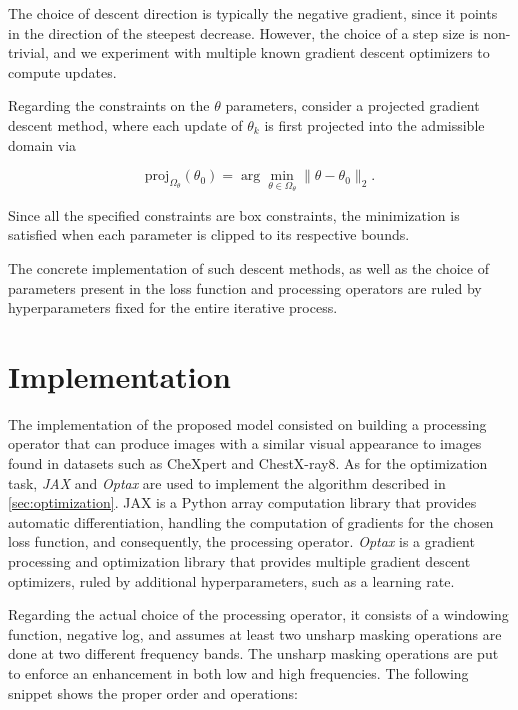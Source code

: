 \documentclass[nomenclature, english, bibtex]{kththesis}
\numberwithin{listing}{chapter}
\begin{document}
The choice of descent direction is typically the negative gradient, since it points in the direction of the steepest
decrease. However, the choice of a step size is non-trivial, and we experiment with multiple known gradient descent
optimizers to compute updates.

Regarding the constraints on the $\theta$ parameters, consider a projected gradient descent method, where
each update of  $\theta_k$ is first projected into the admissible domain via

\begin{equation}
    \mathrm{proj}_{\Omega_\theta}(\theta_0) = \arg\min_{\theta \in \Omega_\theta} \lVert \theta - \theta_0 \rVert_2.
\end{equation}

Since all the specified constraints are box constraints, the minimization is satisfied when each parameter is
clipped to its respective bounds.

The concrete implementation of such descent methods, as well as the choice of parameters present in the loss function
and processing operators are ruled by hyperparameters fixed for the entire iterative process.

\chapter{Implementation}

The implementation of the proposed model consisted on building a processing operator that can produce images with a similar
visual appearance to images found in datasets such as CheXpert and ChestX-ray8. As for the optimization task,
\textit{JAX} \cite{jax2018github} and \textit{Optax} \cite{deepmind2020jax} are used to implement the
algorithm described in \autoref{sec:optimization}. JAX is a Python array computation library that provides automatic
differentiation, handling the computation of gradients for the chosen loss function, and consequently, the processing
operator. \textit{Optax} is a gradient processing and optimization library that provides multiple gradient descent optimizers, ruled
by additional hyperparameters, such as a learning rate.


Regarding the actual choice of the processing operator, it consists of a windowing function,
negative log, and assumes at least two unsharp masking operations are done at two different
frequency bands. The unsharp masking operations are put to enforce an enhancement in both
low and high frequencies. The following snippet shows the proper order and operations:
\end{document}
